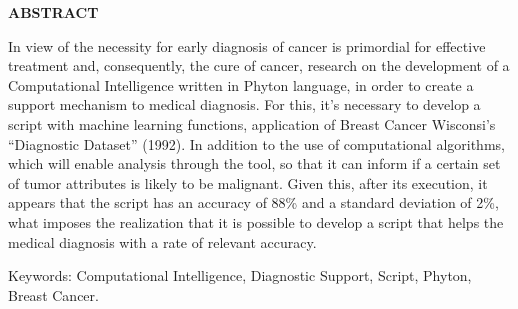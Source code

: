 \begin{center}
\textbf{ABSTRACT}
\end{center}

$\!$\\
\noindent
In view of the necessity for early diagnosis of cancer is primordial for effective treatment and, 
consequently, 
the cure of cancer, 
research on the development of a Computational Intelligence written in Phyton language, 
in order to create a support mechanism to medical diagnosis. 
For this, 
it’s necessary to develop a script with machine learning functions, 
application of Breast Cancer Wisconsi's “Diagnostic Dataset” (1992). 
In addition to the use of computational algorithms, 
which will enable analysis through the tool, 
so that it can inform if a certain set of tumor attributes is likely to be malignant. 
Given this, after its execution, it appears that the script has an accuracy of 88\% and a standard deviation of 2\%, 
what imposes the realization that it is possible to develop a script that helps the medical diagnosis with a rate of relevant accuracy.

\vspace{1cm}

\hspace{-1.3cm}Keywords: Computational Intelligence, Diagnostic Support, Script, Phyton, Breast Cancer.
